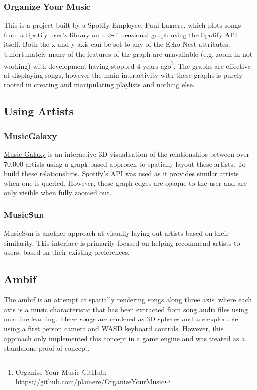 \subsubsection{Organize Your Music}
This is a project built by a Spotify Employee, Paul Lamere, which plots songs from a Spotify user's library on a 2-dimensional graph using the Spotify API itself. Both the x and y axis can be set to any of the Echo Nest attributes. Unfortunately many of the features of the graph are unavailable (e.g. zoom in not working) with development having stopped 4 years ago\footnote{Organise Your Music GitHub: https://github.com/plamere/OrganizeYourMusic}. The graphs are effective at displaying songs, however the main interactivity with these graphs is purely rooted in creating and manipulating playlists and nothing else.

\subsection{Using Artists}
\subsubsection{MusicGalaxy}
\href{https://galaxy.spotifytrack.net/}{Music Galaxy} is an interactive 3D visualisation of the relationships between over 70,000 artists using a graph-based approach to spatially layout these artists. To build these relationships, Spotify's API was used as it provides similar artists when one is queried. However, these graph edges are opaque to the user and are only visible when fully zoomed out.

\subsubsection{MusicSun}
MusicSun\cite{musicsun} is another approach at visually laying out artists based on their similarity. This interface is primarily focused on helping recommend artists to users, based on their existing preferences.

\subsection{Ambif}
The ambif\cite{AMBIF} is an attempt at spatially rendering songs along three axis, where each axis is a music characteristic that has been extracted from song audio files using machine learning. These songs are rendered as 3D spheres and are explorable using a first person camera and WASD keyboard controls. However, this approach only implemented this concept in a game engine and was treated as a standalone proof-of-concept.

